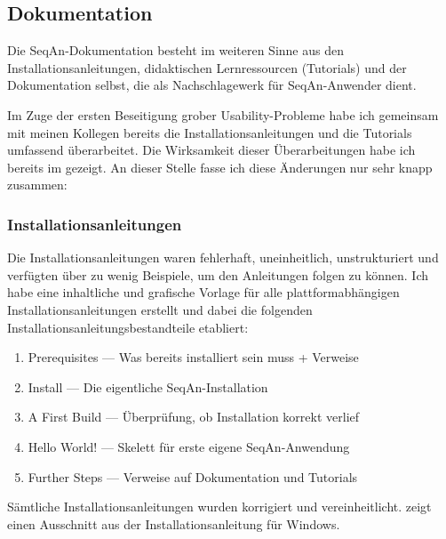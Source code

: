 \subsection{Dokumentation}
\label{sec:improve-dox}

Die SeqAn-Dokumentation besteht im weiteren Sinne aus den Installationsanleitungen, didaktischen Lernressourcen (Tutorials) und der Dokumentation selbst, die als Nachschlagewerk für SeqAn-Anwender dient.

Im Zuge der ersten Beseitigung grober Usability-Probleme habe ich gemeinsam mit meinen Kollegen bereits die Installationsanleitungen und die Tutorials umfassend überarbeitet. Die Wirksamkeit dieser Überarbeitungen habe ich bereits im  gezeigt. An dieser Stelle fasse ich diese Änderungen nur sehr knapp zusammen:


\subsubsection{Installationsanleitungen}

Die Installationsanleitungen waren fehlerhaft, uneinheitlich, unstrukturiert und verfügten über zu wenig Beispiele, um den Anleitungen folgen zu können. Ich habe eine inhaltliche und grafische Vorlage für alle plattformabhängigen Installationsanleitungen erstellt und dabei die folgenden Installationsanleitungsbestandteile etabliert:
\begin{enumerate}
\itemsep1pt\parskip0pt
  \item Prerequisites --- Was bereits installiert sein muss + Verweise
  \item Install --- Die eigentliche SeqAn-Installation
  \item A First Build --- Überprüfung, ob Installation korrekt verlief
  \item Hello World! --- Skelett für erste eigene SeqAn-Anwendung
  \item Further Steps --- Verweise auf Dokumentation und Tutorials
\end{enumerate}

Sämtliche Installationsanleitungen wurden korrigiert und vereinheitlicht.  zeigt einen Ausschnitt aus der Installationsanleitung für Windows.

